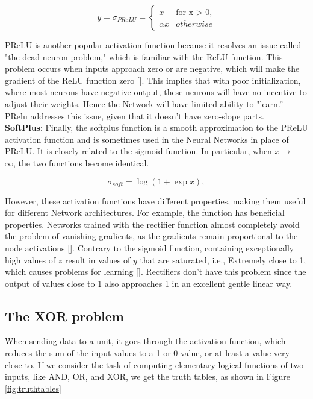 \begin{equation}
  y = \sigma_{PReLU} = \begin{cases} x & \text{for x > 0},   \\
        \alpha x & otherwise      %
        \end{cases}
\end{equation}


PReLU is another popular activation function because it resolves an issue called "the dead neuron problem," which is familiar with the ReLU function. This problem occurs when inputs approach zero or are negative, which will make the gradient of the ReLU function
zero [\cite{QingJie_2017}]. This implies that with poor initialization, where most neurons have negative output, these
neurons will have no incentive to adjust their weights. Hence the Network will have limited ability to "learn.” PRelu addresses this issue, given that it doesn’t have zero-slope parts.\\


\textbf{SoftPlus}: Finally, the softplus function is a smooth approximation to the PReLU activation function and is sometimes used in the Neural Networks in place of PReLU. It is closely related to the sigmoid function. In particular, when $x \to$ −$\infty $, the two functions become identical.

\begin{equation}
\label{eq:softfunc}
 \sigma_{soft}= \log\left(1+\exp{x}\right),
\end{equation}

However, these activation functions have different properties, making them useful for different Network architectures. For example, the  function has beneficial properties. Networks trained with the rectifier function almost completely avoid the problem of vanishing gradients, as the gradients remain proportional to the node activations [\cite{Goodfellow-et-al-2016}]. Contrary to the sigmoid function, containing exceptionally high values of $z$ result in values   of $y$ that are saturated, i.e.,
Extremely close to 1, which causes problems for learning [\cite{Jurafsky2009}]. Rectifiers don’t have this problem since the output of values close to 1 also approaches 1 in an excellent gentle linear way.

\subsection{The XOR problem}
\label{sec:xor_problem}
When sending data to a unit, it goes through the activation function, which reduces the sum of the input values to a 1 or 0 value, or at least a value very close to. If we consider the task of computing elementary logical functions of two inputs, like AND, OR, and XOR, we get the truth tables, as shown in Figure \ref{fig:truthtables}


